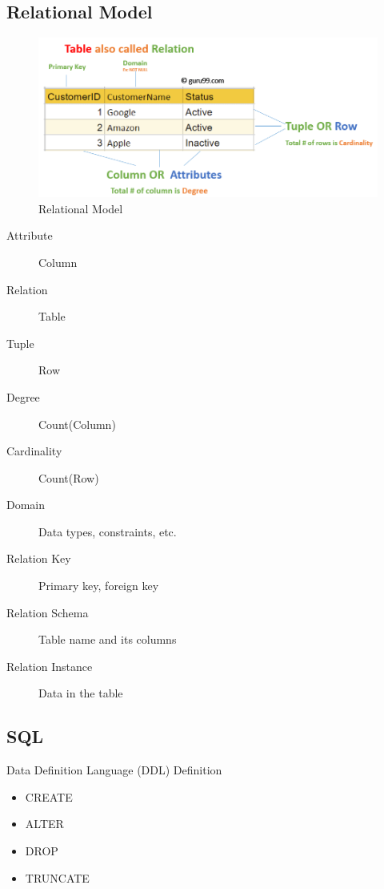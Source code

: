 \documentclass[11pt,journal,compsoc]{IEEEtran}
\begin{document}
\subsection{Relational Model}

\begin{figure}[H]
    \centering
    \includegraphics[width=\linewidth]{RelationalModel.jpg}
    \caption{Relational Model}
\end{figure}

\begin{description}
    \item[Attribute] Column
    \item[Relation] Table
    \item[Tuple] Row
    \item[Degree] Count(Column)
    \item[Cardinality] Count(Row)
    \item[Domain] Data types, constraints, etc.
    \item[Relation Key] Primary key, foreign key
    \item[Relation Schema] Table name and its columns
    \item[Relation Instance] Data in the table
\end{description}


\subsection{SQL}

Data Definition Language (DDL) Definition

\begin{itemize}
    \item CREATE
    \item ALTER
    \item DROP
    \item TRUNCATE
\end{itemize}
\end{document}
